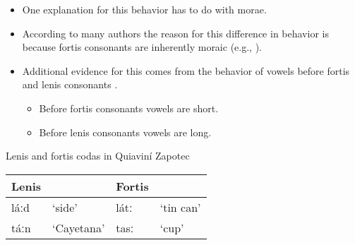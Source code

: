\documentclass[12pt, letterpaper]{article}
\begin{document}
\begin{itemize}
	\item One explanation for this behavior has to do with morae. 
	\item According to many authors the reason for this difference in behavior is because fortis consonants are inherently moraic (e.g., \cite{chavez-peonInteractionMetricalStructure2010,uchiharaFortisLenisGlides2016} ). 
	\item Additional evidence for this comes from the behavior of vowels before fortis and lenis consonants \citep{arellanesSistemaFonologicoPropiedades2009,chavez-peonInteractionMetricalStructure2010,uchiharaFortisLenisGlides2016}.
	\begin{itemize}
		\item Before fortis consonants vowels are short.
		\item Before lenis consonants vowels are long. 
	\end{itemize}
\end{itemize}

\ea Lenis and fortis codas in Quiaviní Zapotec\\ 
 	\begin{tabular}{llll}
 		Lenis && Fortis &  \\
		\midrule
		láːd & `side' & látː & `tin can' \\
		táːn & `Cayetana'	& tasː	& `cup' \\ 
 	\end{tabular}
\z 
\end{document}
